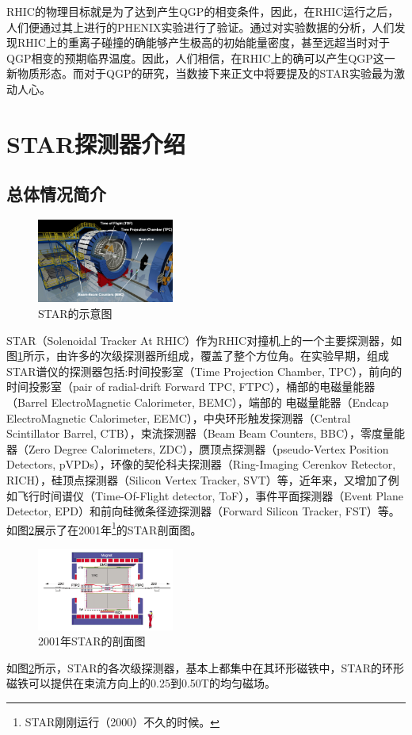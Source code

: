 \documentclass[%
 reprint,
 amsmath,amssymb,
 aps,
]{revtex4-1}
\begin{document}
RHIC的物理目标就是为了达到产生QGP的相变条件，因此，在RHIC运行之后，人们便通过其上进行的PHENIX实验进行了验证。通过对实验数据的分析，人们发现RHIC上的重离子碰撞的确能够产生极高的初始能量密度，甚至远超当时对于QGP相变的预期临界温度。因此，人们相信，在RHIC上的确可以产生QGP这一新物质形态。而对于QGP的研究，当数接下来正文中将要提及的STAR实验最为激动人心。
\section{\label{sec:STAR}STAR探测器介绍}
\subsection{\label{sec:staroverview}总体情况简介}
\begin{figure}[htbp]
    \includegraphics[width=0.4\textwidth]{Plots/STAR.png}
    \caption{\label{fig:STAR}STAR的示意图}
\end{figure}
STAR（Solenoidal Tracker At RHIC）作为RHIC对撞机上的一个主要探测器，如图\ref{fig:STAR}所示，由许多的次级探测器所组成，覆盖了整个方位角。在实验早期，组成STAR谱仪的探测器包括:时间投影室（Time Projection Chamber, TPC），前向的时间投影室（pair of radial-drift Forward TPC, FTPC），桶部的电磁量能器（Barrel ElectroMagnetic Calorimeter, BEMC），端部的 电磁量能器（Endcap ElectroMagnetic Calorimeter, EEMC），中央环形触发探测器（Central Scintillator Barrel, CTB），束流探测器（Beam Beam Counters, BBC），零度量能器（Zero Degree Calorimeters, ZDC），赝顶点探测器（pseudo-Vertex Position Detectors, pVPDs），环像的契伦科夫探测器（Ring-Imaging Cerenkov Retector, RICH），硅顶点探测器（Silicon Vertex Tracker, SVT）等，近年来，又增加了例如飞行时间谱仪（Time-Of-Flight detector, ToF），事件平面探测器（Event Plane Detector, EPD）和前向硅微条径迹探测器（Forward Silicon Tracker, FST）等。如图\ref{fig:STARXsec}展示了在2001年\footnote{STAR刚刚运行（2000）不久的时候。}的STAR剖面图。
\begin{figure}[htbp]
    \includegraphics[width = 0.4\textwidth]{Plots/STARXsec.png}
    \caption{\label{fig:STARXsec}2001年STAR的剖面图}
\end{figure}
如图\ref{fig:STARXsec}所示，STAR的各次级探测器，基本上都集中在其环形磁铁中，STAR的环形磁铁可以提供在束流方向上的0.25到0.50T的均匀磁场。
\end{document}
